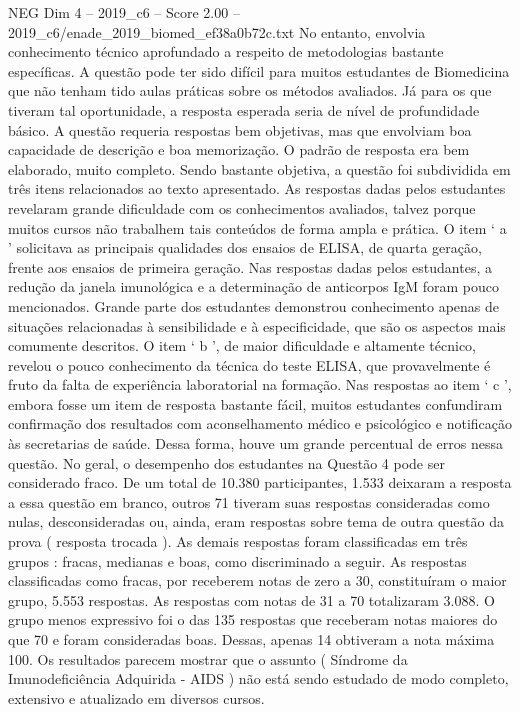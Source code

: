 \begin{textsample}{NEG Dim 4 – 2019\_c6 – Score 2.00 – 2019\_c6/enade\_2019\_biomed\_ef38a0b72c.txt}
No entanto, envolvia conhecimento técnico aprofundado a respeito de metodologias bastante específicas.
A questão pode ter sido difícil para muitos estudantes de Biomedicina que não tenham tido aulas práticas sobre os métodos avaliados.
Já para os que tiveram tal oportunidade, a resposta esperada seria de nível de profundidade básico.
A questão requeria respostas bem objetivas, mas que envolviam boa capacidade de descrição e boa memorização.
O padrão de resposta era bem elaborado, muito completo.
Sendo bastante objetiva, a questão foi subdividida em três itens relacionados ao texto apresentado.
As respostas dadas pelos estudantes revelaram grande dificuldade com os conhecimentos avaliados, talvez porque muitos cursos não trabalhem tais conteúdos de forma ampla e prática.
O item ‘ a ’ solicitava as principais qualidades dos ensaios de ELISA, de quarta geração, frente aos ensaios de primeira geração.
Nas respostas dadas pelos estudantes, a redução da janela imunológica e a determinação de anticorpos IgM foram pouco mencionados.
Grande parte dos estudantes demonstrou conhecimento apenas de situações relacionadas à sensibilidade e à especificidade, que são os aspectos mais comumente descritos.
O item ‘ b ’, de maior dificuldade e altamente técnico, revelou o pouco conhecimento da técnica do teste ELISA, que provavelmente é fruto da falta de experiência laboratorial na formação.
Nas respostas ao item ‘ c ’, embora fosse um item de resposta bastante fácil, muitos estudantes confundiram confirmação dos resultados com aconselhamento médico e psicológico e notificação às secretarias de saúde.
Dessa forma, houve um grande percentual de erros nessa questão.
No geral, o desempenho dos estudantes na Questão 4 pode ser considerado fraco.
De um total de 10.380 participantes, 1.533 deixaram a resposta a essa questão em branco, outros 71 tiveram suas respostas consideradas como nulas, desconsideradas ou, ainda, eram respostas sobre tema de outra questão da prova ( resposta trocada ).
As demais respostas foram classificadas em três grupos : fracas, medianas e boas, como discriminado a seguir.
As respostas classificadas como fracas, por receberem notas de zero a 30, constituíram o maior grupo, 5.553 respostas.
As respostas com notas de 31 a 70 totalizaram 3.088.
O grupo menos expressivo foi o das 135 respostas que receberam notas maiores do que 70 e foram consideradas boas.
Dessas, apenas 14 obtiveram a nota máxima 100.
Os resultados parecem mostrar que o assunto ( Síndrome da Imunodeficiência Adquirida - AIDS ) não está sendo estudado de modo completo, extensivo e atualizado em diversos cursos.

\end{textsample}
